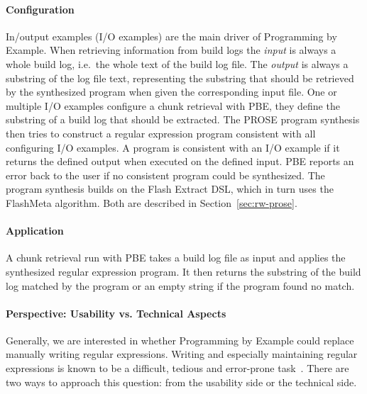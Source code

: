 \documentclass[\myrootdir/main.tex]{subfiles}
\begin{document}
\paragraph{Configuration}
In/output examples (I/O examples) are the main driver of Programming by Example.
When retrieving information from build logs the \emph{input} is always a whole build log, i.e.\ the whole text of the build log file.
The \emph{output} is always a substring of the log file text, representing the substring that should be retrieved by the synthesized program when given the corresponding input file.
One or multiple I/O examples configure a chunk retrieval with PBE, they define the substring of a build log that should be extracted.
The PROSE program synthesis then tries to construct a regular expression program consistent with all configuring I/O examples.
A program is consistent with an I/O example if it returns the defined output when executed on the defined input.
PBE reports an error back to the user if no consistent program could be synthesized.
The program synthesis builds on the Flash Extract DSL, which in turn uses the FlashMeta algorithm.
Both are described in Section~\ref{sec:rw-prose}.

\paragraph{Application}
A chunk retrieval run with PBE takes a build log file as input and applies the synthesized regular expression program.
It then returns the substring of the build log matched by the program or an empty string if the program found no match.

\paragraph{Perspective: Usability vs. Technical Aspects}
Generally, we are interested in whether Programming by Example could replace manually writing regular expressions.
Writing and especially maintaining regular expressions is known to be a difficult, tedious and error-prone task~\cite{michael2019regexes}.
There are two ways to approach this question: from the usability side or the technical side.
\end{document}
